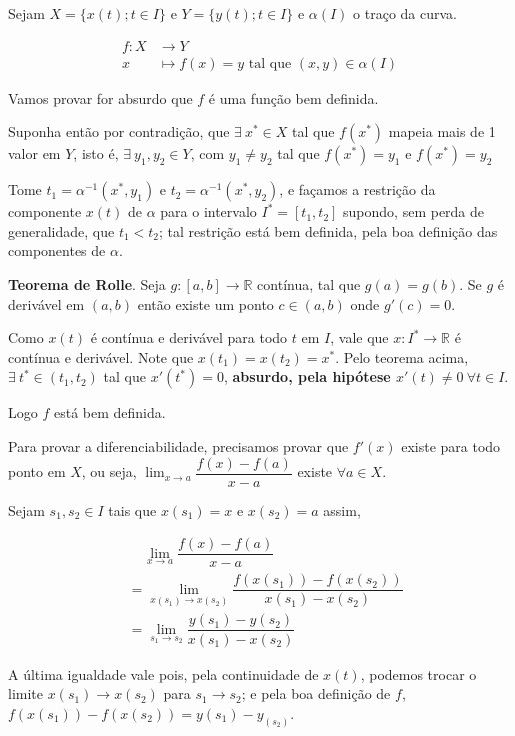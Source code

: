 \documentclass[12pt,letterpaper]{article}
\begin{document}
\begin{enumerate}
		Sejam $X=\{x(t);t \in  I\}$ e $Y=\{y(t);t\in I \}$ e $\alpha(I)$ o traço da curva.
		
		\begin{align*}
		f: X &\to Y\\
		x&\mapsto f(x)=y\text{ tal que }(x,y)\in\alpha(I)
		\end{align*}
		
		Vamos provar for absurdo que $f$ é uma função bem definida.
		
		Suponha então por contradição, que $\exists~x^*\in X$ tal que $f(x^*)$ mapeia mais de 1 valor em $Y$, isto é, $\exists~y_1,y_2\in Y$, com $y_1\neq y_2$ tal que $f(x^*)=y_1$ e $f(x^*)=y_2$
		
		Tome $t_1=\alpha^{-1}(x^*,y_1)$ e $t_2=\alpha^{-1}(x^*,y_2)$, e façamos a restrição da componente $x(t)$ de $\alpha$ para o intervalo $I^*=[t_1,t_2]$ supondo, sem perda de generalidade, que $t_1<t_2$; tal restrição está bem definida, pela boa definição das componentes de $\alpha$.
		
		
		\textbf{Teorema de Rolle}\cite{lima1981curso}. Seja $g:[a,b]\to\mathbb{R}$ contínua, tal que $g(a)=g(b)$. Se $g$ é derivável em $(a,b)$ então existe um ponto $c\in(a,b)$ onde $g'(c)=0$.
		
		Como $x(t)$ é contínua e derivável para todo $t$ em $I$, vale que $x:I^*\to\mathbb{R}$ é contínua e derivável. Note que $x(t_1)=x(t_2)=x^*$. Pelo teorema acima, $\exists ~t^*\in(t_1,t_2)$ tal que $x'(t^*)=0$, \textbf{absurdo, pela hipótese $x'(t) \neq  0~\forall t \in I$}.
		
		Logo $f$ está bem definida.
		
		Para provar a diferenciabilidade, precisamos provar que $f'(x)$ existe para todo ponto em $X$, ou seja, $\lim_{x\to a}\dfrac{f(x)-f(a)}{x-a}$ existe $\forall a \in X$.
		
		Sejam $s_1,s_2\in I$ tais que $x(s_1)=x$ e $x(s_2)=a$ assim,
		
		\begin{align*}&~~~~~\lim_{x\to a}\dfrac{f(x)-f(a)}{x-a}\\&=\lim_{x(s_1)\to x(s_2)}\dfrac{f(x(s_1))-f(x(s_2))}{x(s_1)-x(s_2)}\\&=\lim_{s_1\to s_2}\dfrac{y(s_1)-y(s_2)}{x(s_1)-x(s_2)}\end{align*}
		
		A última igualdade vale pois, pela continuidade de $x(t)$, podemos trocar o limite $x(s_1)\to x(s_2)$ para $s_1\to s_2$; e pela boa definição de $f$, $f(x(s_1))-f(x(s_2))=y(s_1)-y_(s_2)$.
		

\end{enumerate}
\end{document}
